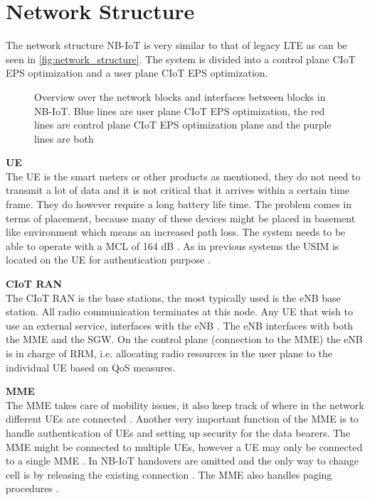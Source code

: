  \section{Network Structure}

The network structure \gls{NB-IoT} is very similar to that of legacy \gls{LTE} as can be seen in \autoref{fig:network_structure}. The system is divided into a control plane \gls{CIoT} \gls{EPS} optimization and a user plane \gls{CIoT} \gls{EPS} optimization.

\begin{figure}[H]
\centering

\caption{Overview over the network blocks and interfaces between blocks in \gls{NB-IoT}. Blue lines are user plane \gls{CIoT} \gls{EPS} optimization, the red lines are control plane \gls{CIoT} \gls{EPS} optimization plane and the purple lines are both \citep{NB_slide}}
\label{fig:network_structure}
\end{figure}


\textbf{\gls{UE}}\\
The \gls{UE} is the smart meters or other products as mentioned, they do not need to transmit a lot of data and it is not critical that it arrives within a certain time frame. They do however require a long battery life time. The problem comes in terms of placement, because many of these devices might be placed in basement like environment which means an increased path loss. The system needs to be able to operate with a \gls{MCL} of 164 dB \citep{REL-13}. As in previous systems the \gls{USIM} is located on the \gls{UE} for authentication purpose \citep[ch. 3]{book_LTE_for_UMTS}.

\textbf{\gls{CIoT} \gls{RAN}}\\
The \gls{CIoT} \gls{RAN} is the base stations, the most typically used is the \gls{eNB} base station. All radio communication terminates at this node. Any \gls{UE} that wish to use an external service, interfaces with the \gls{eNB} \citep{book_LTE_for_UMTS}. The \gls{eNB} interfaces with both the \gls{MME} and the \gls{SGW}. On the control plane (connection to the \gls{MME}) the \gls{eNB} is in charge of \gls{RRM}, i.e. allocating radio resources in the user plane to the individual \gls{UE} based on \gls{QoS} measures. 

\textbf{\gls{MME}}\\
The \gls{MME} takes care of mobility issues, it also keep track of where in the network different \gls{UE}s are connected . Another very important function of the \gls{MME} is to handle authentication of \gls{UE}s and setting up security for the data bearers. The \gls{MME} might be connected to multiple \gls{UE}s, however a \gls{UE} may only be connected to a single \gls{MME} \citep[ch. 3]{book_LTE_for_UMTS}. In \gls{NB-IoT} handovers are omitted and the only way to change cell is by releasing the existing connection \citep{REL-13}. The \gls{MME} also handles paging procedures \citep{NB-IoT_Book}.

